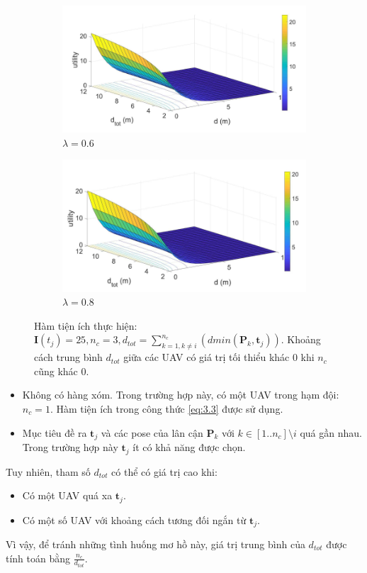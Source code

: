 \documentclass[11pt,openany]{book}
\begin{document}
\begin{figure}[H]
    \begin{subfigure}[H]{0.4\linewidth}
        \centering
        \includegraphics[width=\linewidth]{assets/3_8_c.png}
        \caption{{$\lambda=0.6$}}
        \label{fig:3.8c}
    \end{subfigure}
    \begin{subfigure}[H]{0.4\linewidth}
        \centering
        \includegraphics[width=\linewidth]{assets/3_8_d.png}
        \caption{{$\lambda=0.8$}}
        \label{fig:3.8d}
    \end{subfigure}
    \caption{{Hàm tiện ích thực hiện: $\mathbf{I}(t_j)=25, n_c=3, d_{tot} = \sum_{k=1, k\neq i}^{n_c}(dmin(\mathbf{P}_k,\mathbf{t}_j))$. Khoảng cách trung bình $d_{tot}$ giữa các UAV có giá trị tối thiểu khác 0 khi $n_c$ cũng khác 0.}}
    \label{fig:3.8}
\end{figure}
\begin{itemize}
    \item Không có hàng xóm. Trong trường hợp này, có một UAV trong hạm đội: $n_c=1$. Hàm tiện ích trong công thức \ref{eq:3.3} được sử dụng.
    \item Mục tiêu đề ra $\mathbf{t}_j$ và các pose của lân cận $\mathbf{P}_k$ với $k \in [1..n_c]\setminus i$ quá gần nhau. Trong trường hợp này $\mathbf{t}_j$ ít có khả năng được chọn.
\end{itemize}
Tuy nhiên, tham số $d_{tot}$ có thể có giá trị cao khi:
\begin{itemize}
    \item Có một UAV quá xa $\mathbf{t}_j$.
    \item Có một số UAV với khoảng cách tương đối ngắn từ $\mathbf{t}_j$.
\end{itemize}
Vì vậy, để tránh những tình huống mơ hồ này, giá trị trung bình của $d_{tot}$ được tính toán bằng $\frac{n_c}{d_{tot}}$.
\end{document}

